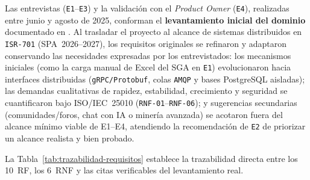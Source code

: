 \documentclass[11pt,a4paper]{article}
\begin{document}
Las entrevistas (\texttt{E1}--\texttt{E3}) y la validación con el \textit{Product Owner} (\texttt{E4}), realizadas entre junio y agosto de 2025, conforman el \textbf{levantamiento inicial del dominio} documentado en . Al trasladar el proyecto al alcance de sistemas distribuidos en \texttt{ISR-701} (SPA~2026--2027), los requisitos originales se refinaron y adaptaron conservando las necesidades expresadas por los entrevistados: los mecanismos iniciales (como la carga manual de Excel del SGA en \texttt{E1}) evolucionaron hacia interfaces distribuidas (\texttt{gRPC/Protobuf}, colas \texttt{AMQP} y bases PostgreSQL aisladas); las demandas cualitativas de rapidez, estabilidad, crecimiento y seguridad se cuantificaron bajo ISO/IEC~25010 (\texttt{RNF-01}--\texttt{RNF-06}); y sugerencias secundarias (comunidades/foros, chat con IA o minería avanzada) se acotaron fuera del alcance mínimo viable de E1--E4, atendiendo la recomendación de \texttt{E2} de priorizar un alcance realista y bien probado.

La Tabla~\ref{tab:trazabilidad-requisitos} establece la trazabilidad directa entre los 10~RF, los 6~RNF y las citas verificables del levantamiento real.
\end{document}
